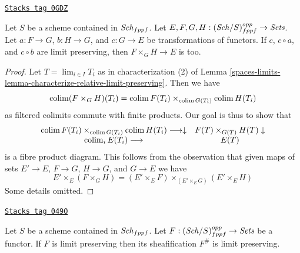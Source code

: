 \begin{lemma}
\label{spaces-limits-lemma-fibre-product-locally-finite-presentation}
\href{https://stacks.math.columbia.edu/tag/0GDZ}{\texttt{Stacks tag 0GDZ}}

Let $S$ be a scheme contained in $\mathit{Sch}_{fppf}$.
Let $E, F, G, H : (\mathit{Sch}/S)_{fppf}^{opp} \to \textit{Sets}$.
Let $a : F \to G$, $b : H \to G$, and $c : G \to E$
be transformations of functors. If $c$, $c \circ a$, and $c \circ b$
are limit preserving, then $F \times_G H \to E$ is too.
\end{lemma}

\begin{proof}
Let $T = \lim_{i \in I} T_i$ as in characterization (2) of
Lemma \ref{spaces-limits-lemma-characterize-relative-limit-preserving}.
Then we have
$$
\operatorname{colim} (F \times_G H)(T_i) =
\operatorname{colim} F(T_i) \times_{\operatorname{colim} G(T_i)} \operatorname{colim} H(T_i)
$$
as filtered colimits commute with finite products. Our goal is thus to
show that
$$
\begin{array}{cc}\operatorname{colim} F(T_i) \times_{\operatorname{colim} G(T_i)} \operatorname{colim} H(T_i) \longrightarrow\downarrow & F(T) \times_{G(T)} H(T) \downarrow \\ \operatorname{colim}_i E(T_i) \longrightarrow & E(T)\end{array}
$$
is a fibre product diagram. This follows from the observation that
given maps of sets $E' \to E$, $F \to G$, $H \to G$, and $G \to E$
we have
$$
E' \times_E (F \times_G H) =
(E' \times_E F) \times_{(E' \times_E G)} (E' \times_E H)
$$
Some details omitted.
\end{proof}

\begin{lemma}
\label{spaces-limits-lemma-sheafify-finite-presentation}
\href{https://stacks.math.columbia.edu/tag/049O}{\texttt{Stacks tag 049O}}

Let $S$ be a scheme contained in $\mathit{Sch}_{fppf}$.
Let $F : (\mathit{Sch}/S)_{fppf}^{opp} \to \textit{Sets}$ be a functor.
If $F$ is limit preserving then its sheafification $F^\#$ is limit preserving.
\end{lemma}

